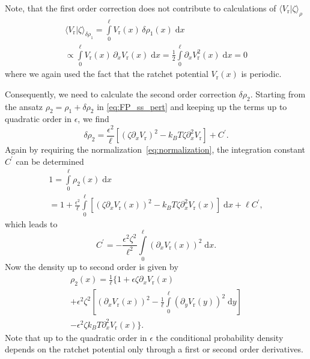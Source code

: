 \documentclass[aps,pre,twocolumn,showpacs,showkeys,superscriptaddress,floatfix]{revtex4-1}
\newcommand{\rmd}{{\mathrm d}}
\begin{document}
Note, that the first order correction does not contribute to calculations of $\langle V_\text{r} | \zeta \rangle_\rho$ 
\begin{multline*}
\langle V_\text{r} | \zeta \rangle_{\delta \rho_1} 
= \int\limits_0^\ell V_\text{r}(x) \, \delta\rho_1(x) \; \rmd x
\\
\propto \int\limits_0^\ell V_\text{r}(x) \, \partial_x V_\text{r}(x) \; \rmd x 
= \frac{1}{2} \int\limits_0^\ell \partial_x V_\text{r}^2(x) \; \rmd x 
= 0
\end{multline*}
where we again used the fact that the ratchet potential $V_\text{r}(x)$ is periodic.

Consequently, we need to calculate the second order correction $\delta\rho_2$. 
Starting from the ansatz $\rho_2 = \rho_1 + \delta\rho_2$ in \eqref{eq:FP_ss_pert} and keeping up the terms up to quadratic order in $\epsilon$, we find
\begin{equation*}
\delta\rho_2 = \frac{ \epsilon^2 }{ \ell } \left[ \left( \zeta \partial_x V_\text{r} \right)^2 - k_B T \zeta \partial_x^2 V_\text{r} \right] + C^\prime .
\end{equation*}
Again by requiring the normalization~\eqref{eq:normalization}, the integration constant $C^\prime$ can be determined
\begin{multline*}
1 = \int\limits_0^\ell \rho_2(x) \; \rmd x 
\\
= 1  
+ \frac{\epsilon^2}{ \ell } \int\limits_0^\ell \left[ \left( \zeta \partial_x V_\text{r}(x) \right)^2 - k_B T \zeta \partial_x^2 V_\text{r}(x) \right] \; \rmd x 
+ \ell C^\prime ,
\end{multline*}
which leads to
\begin{equation}
C^\prime = - \frac{\epsilon^2 \zeta^2}{ \ell^2 } \int\limits_0^\ell \left( \partial_x V_\text{r}(x) \right)^2 \; \rmd x . 
\end{equation}
Now the density up to second order is given by
\begin{multline}
\rho_2(x)  
= \frac{1}{\ell} \Biggl\{ 1  + \epsilon \zeta \partial_x V_\text{r}(x) \\
+ \epsilon^2 \zeta^2 \left[ \left( \partial_x V_\text{r}(x) \right)^2 - \frac{1}{\ell} \int\limits_0^\ell \left( \partial_y V_\text{r}(y) \right)^2 \; \rmd y \right] 
\\
- \epsilon^2 \zeta k_B T \partial_x^2 V_\text{r}(x)  
\Biggr\} .
\label{eq:prob_density_large}
\end{multline}
Note that up to the quadratic order in $\epsilon$ the conditional probability density depends on the ratchet potential only through a first or second order derivatives. 
\end{document}
